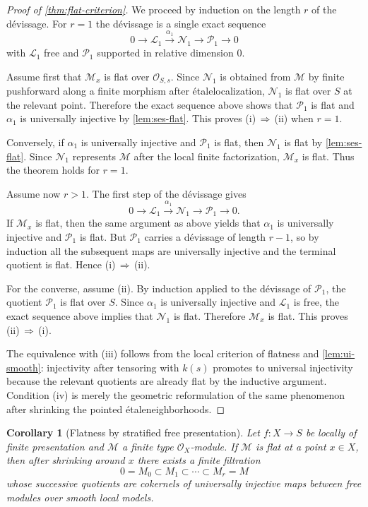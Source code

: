 \documentclass[11pt,oneside]{article}
\newtheorem{corollary}[theorem]{Corollary}
\newcommand{\Lcal}{\mathcal L}
\newcommand{\M}{\mathcal M}
\newcommand{\N}{\mathcal N}
\newcommand{\Pcal}{\mathcal P}
\newcommand{\OO}{\mathcal O}
\newcommand{\etale}{\'etale}
\begin{document}
\begin{proof}[Proof of \cref{thm:flat-criterion}]
We proceed by induction on the length $r$ of the d\'evissage.  For $r=1$ the d\'evissage is a single exact sequence
\[
0\to \Lcal_1\xrightarrow{\alpha_1}\N_1\to \Pcal_1\to 0
\]
with $\Lcal_1$ free and $\Pcal_1$ supported in relative dimension $0$.

Assume first that $\M_x$ is flat over $\OO_{S,s}$.  Since $\N_1$ is obtained from $\M$ by finite pushforward along a finite morphism after \etale localization, $\N_1$ is flat over $S$ at the relevant point.  Therefore the exact sequence above shows that $\Pcal_1$ is flat and $\alpha_1$ is universally injective by \cref{lem:ses-flat}.  This proves \textup{(i)}\,$\Rightarrow$\,\textup{(ii)} when $r=1$.

Conversely, if $\alpha_1$ is universally injective and $\Pcal_1$ is flat, then $\N_1$ is flat by \cref{lem:ses-flat}.  Since $\N_1$ represents $\M$ after the local finite factorization, $\M_x$ is flat.  Thus the theorem holds for $r=1$.

Assume now $r>1$.  The first step of the d\'evissage gives
\[
0\to \Lcal_1\xrightarrow{\alpha_1}\N_1\to \Pcal_1\to 0.
\]
If $\M_x$ is flat, then the same argument as above yields that $\alpha_1$ is universally injective and $\Pcal_1$ is flat.  But $\Pcal_1$ carries a d\'evissage of length $r-1$, so by induction all the subsequent maps are universally injective and the terminal quotient is flat.  Hence \textup{(i)}\,$\Rightarrow$\,\textup{(ii)}.

For the converse, assume \textup{(ii)}.  By induction applied to the d\'evissage of $\Pcal_1$, the quotient $\Pcal_1$ is flat over $S$.  Since $\alpha_1$ is universally injective and $\Lcal_1$ is free, the exact sequence above implies that $\N_1$ is flat.  Therefore $\M_x$ is flat.  This proves \textup{(ii)}\,$\Rightarrow$\,\textup{(i)}.

The equivalence with \textup{(iii)} follows from the local criterion of flatness and \cref{lem:ui-smooth}: injectivity after tensoring with $k(s)$ promotes to universal injectivity because the relevant quotients are already flat by the inductive argument.  Condition \textup{(iv)} is merely the geometric reformulation of the same phenomenon after shrinking the pointed \etale neighborhoods.
\end{proof}

\begin{corollary}[Flatness by stratified free presentation]\label{cor:flat-open-near-point}
Let $f\colon X\to S$ be locally of finite presentation and $\M$ a finite type $\OO_X$-module.  If $\M$ is flat at a point $x\in X$, then after shrinking around $x$ there exists a finite filtration
\[
0=M_0\subset M_1\subset\cdots\subset M_r=M
\]
whose successive quotients are cokernels of universally injective maps between free modules over smooth local models.
\end{corollary}
\end{document}
